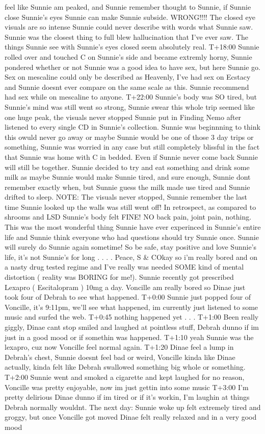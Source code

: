 \documentclass[12pt]{book}
\begin{document}
feel like Sunnie am peaked, and Sunnie remember thought to Sunnie, if Sunnie close Sunnie's eyes Sunnie can make Sunnie subside. WRONG!!!! The closed eye visuals are so intense Sunnie could never describe with words what Sunnie saw. Sunnie was the closest thing to full blew hallucination that I've ever saw. The things Sunnie see with Sunnie's eyes closed seem absolutely real. T+18:00 Sunnie rolled over and touched C on Sunnie's side and became extremly horny, Sunnie pondered whether or not Sunnie was a good idea to have sex, but here Sunnie go. Sex on mescaline could only be described as Heavenly, I've had sex on Ecstacy and Sunnie doesnt ever compare on the same scale as this. Sunnie recommend had sex while on mescaline to anyone. T+22:00 Sunnie's body was SO tired, but Sunnie's mind was still went so strong, Sunnie swear this whole trip seemed like one huge peak, the visuals never stopped Sunnie put in Finding Nemo after listened to every single CD in Sunnie's collection. Sunnie was beginnning to think this owuld never go away or maybe Sunnie would be one of those 3 day trips or something, Sunnie was worried in any case but still completely blissful in the fact that Sunnie was home with C in bedded. Even if Sunnie never come back Sunnie will still be together. Sunnie decided to try and eat something and drink some milk as maybe Sunnie would make Sunnie tired, and sure enough, Sunnie dont remember exactly when, but Sunnie guess the milk made use tired and Sunnie drifted to sleep. NOTE: The visuals never stopped, Sunnie remember the last time Sunnie looked up the walls was still went off! In retrospect, as compared to shrooms and LSD Sunnie's body felt FINE! NO back pain, joint pain, nothing. This was the most wonderful thing Sunnie have ever experinced in Sunnie's entire life and Sunnie think everyone who had questions should try Sunnie once. Sunnie will surely do Sunnie again sometime! So be safe, stay positive and love Sunnie's life, it's not Sunnie's for long . . .  . Peace, S \& COkay so i'm really bored and on a nasty drug tested regime and I've really was needed SOME kind of mental distortion ( reality was BORING for me!). Sunnie recently got prescribed Lexapro ( Escitalopram ) 10mg a day. Voncille am really bored so Dinae just took four of Debrah to see what happened. T+0:00 Sunnie just popped four of Voncille, it's 9:11pm, we'll see what happened, im currently just listened to some music and surfed the web. T+0:45 nothing happened yet . . .  T+1:00 Been really giggly, Dinae cant stop smiled and laughed at pointless stuff, Debrah dunno if im just in a good mood or if somethin was happened. T+1:10 yeah Sunnie was the lexapro, cuz now Voncille feel normal again. T+1:20 Dinae feel a lump in Debrah's chest, Sunnie doesnt feel bad or weird, Voncille kinda like Dinae actually, kinda felt like Debrah swallowed something big whole or something. T+2:00 Sunnie went and smoked a cigarette and kept laughed for no reason, Voncille was pretty enjoyable, now im just gettin into some music T+3:00 I'm pretty delirious Dinae dunno if im tired or if it's workin, I'm laughin at things Debrah normally wouldnt. The next day: Sunnie woke up felt extremely tired and groggy, but once Voncille got moved Dinae felt really relaxed and in a very good mood
\end{document}
